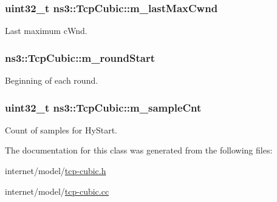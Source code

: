 \subsubsection[{\texorpdfstring{m\+\_\+last\+Max\+Cwnd}{m_lastMaxCwnd}}]{\setlength{\rightskip}{0pt plus 5cm}uint32\+\_\+t ns3\+::\+Tcp\+Cubic\+::m\+\_\+last\+Max\+Cwnd\hspace{0.3cm}{\ttfamily [private]}}\hypertarget{classns3_1_1TcpCubic_adce8ab449a7a20e606b9021c4460b956}{}\label{classns3_1_1TcpCubic_adce8ab449a7a20e606b9021c4460b956}


Last maximum c\+Wnd. 

\subsubsection[{\texorpdfstring{m\+\_\+round\+Start}{m_roundStart}}]{ ns3\+::\+Tcp\+Cubic\+::m\+\_\+round\+Start\hspace{0.3cm}{\ttfamily [private]}}\hypertarget{classns3_1_1TcpCubic_a9c55defdbfe7bb3e12c6dedaece70434}{}\label{classns3_1_1TcpCubic_a9c55defdbfe7bb3e12c6dedaece70434}


Beginning of each round. 

\subsubsection[{\texorpdfstring{m\+\_\+sample\+Cnt}{m_sampleCnt}}]{\setlength{\rightskip}{0pt plus 5cm}uint32\+\_\+t ns3\+::\+Tcp\+Cubic\+::m\+\_\+sample\+Cnt\hspace{0.3cm}{\ttfamily [private]}}\hypertarget{classns3_1_1TcpCubic_a189a416124fb57d08f10b40bbdb43394}{}\label{classns3_1_1TcpCubic_a189a416124fb57d08f10b40bbdb43394}


Count of samples for Hy\+Start. 



The documentation for this class was generated from the following files\+:\begin{DoxyCompactItemize}
\item 
internet/model/\hyperlink{tcp-cubic_8h}{tcp-\/cubic.\+h}\item 
internet/model/\hyperlink{tcp-cubic_8cc}{tcp-\/cubic.\+cc}\end{DoxyCompactItemize}
